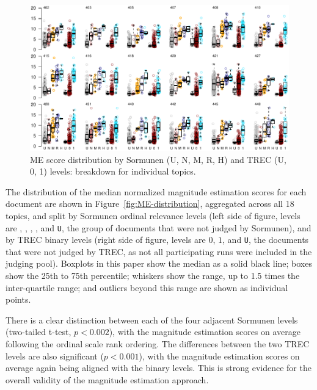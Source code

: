 \begin{figure}[tp]
  \centering
  \includegraphics[width=\linewidth,page=1]{figs/check_gross_ranks_med_all.pdf} %
  \caption{ME score distribution by Sormunen (U, N, M, R, H) and TREC (U, 0, 1) levels:
    breakdown for individual topics.
  \label{fig:ME-distribution-breakdown}
   }
\end{figure}

The distribution of the median normalized magnitude estimation scores
for each document are shown in Figure~\ref{fig:ME-distribution},
aggregated across all 18 topics, and split by Sormunen ordinal
relevance levels (left side of figure, levels are 
\nn, \mm, \rr, \hh, and {\tt U}, the group of documents that were not judged
by Sormunen), and by TREC binary levels (right side of figure, levels
are $0$, $1$, and {\tt U}, the documents that were not judged by TREC,
as not all participating runs were included in the judging pool).
Boxplots in this paper show the median as a solid black line; boxes
show the 25th to 75th percentile; whiskers show the range, up to 1.5
times the inter-quartile range; and outliers beyond this range are
shown as individual points.

There is a clear distinction between each of the four adjacent Sormunen
levels (two-tailed t-test, $p<0.002$), with the magnitude estimation
scores on average following the ordinal scale rank ordering.
The differences between the two TREC levels are also significant
($p<0.001$), with the magnitude estimation scores on average again
being aligned with the binary levels.
This is strong evidence for the overall validity of the magnitude
estimation approach.

